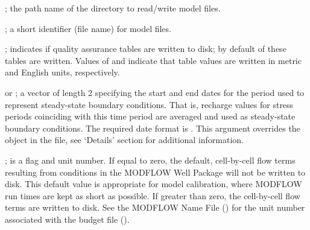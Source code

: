 \documentclass[letterpaper]{book}
\begin{document}
\begin{Arguments}
\begin{ldescription}
\item[\code{dir.run}] ; the path name of the directory to read/write model files.
\item[\code{id}] ; a short identifier (file name) for model files.
\item[\code{qa.tables}] ; indicates if quality assurance tables are written to disk; by default  of these tables are written.
Values of  and  indicate that table values are written in metric and English units, respectively.
\item[\code{ss.interval}]  or ; a vector of length 2 specifying the start and end dates for the period used to represent steady-state boundary conditions.
That is, recharge values for stress periods coinciding with this time period are averaged and used as steady-state boundary conditions.
The required date format is .
This argument overrides the  object in the  file, see `Details' section for additional information.
\item[\code{iwelcb}] ; is a flag and unit number.
If equal to zero, the default, cell-by-cell flow terms resulting from conditions in the MODFLOW Well Package will not be written to disk.
This default value is appropriate for model calibration, where MODFLOW run times are kept as short as possible.
If greater than zero, the cell-by-cell flow terms are written to disk.
See the MODFLOW Name File () for the unit number associated with the budget file ().

\end{ldescription}
\end{Arguments}
%
\end{document}
